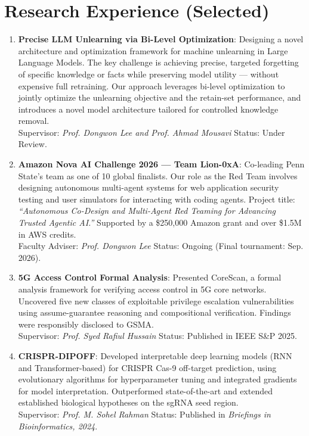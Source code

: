 \section{Research Experience (Selected)}

\begin{enumerate}

    \item \textbf{Precise LLM Unlearning via Bi-Level Optimization}: Designing a novel architecture and optimization framework for machine unlearning in Large Language Models. The key challenge is achieving precise, targeted forgetting of specific knowledge or facts while preserving model utility --- without expensive full retraining. Our approach leverages bi-level optimization to jointly optimize the unlearning objective and the retain-set performance, and introduces a novel model architecture tailored for controlled knowledge removal.\\
    Supervisor: \textit{Prof. Dongwon Lee and Prof. Ahmad Mousavi} \hfill Status: Under Review.

    \item \textbf{Amazon Nova AI Challenge 2026 --- Team Lion-0xA}: Co-leading Penn State's team as one of 10 global finalists. Our role as the Red Team involves designing autonomous multi-agent systems for web application security testing and user simulators for interacting with coding agents. Project title: \textit{``Autonomous Co-Design and Multi-Agent Red Teaming for Advancing Trusted Agentic AI.''} Supported by a \$250{,}000 Amazon grant and over \$1.5M in AWS credits.\\
    Faculty Adviser: \textit{Prof. Dongwon Lee} \hfill Status: Ongoing (Final tournament: Sep. 2026).

    \item \textbf{5G Access Control Formal Analysis}: Presented CoreScan, a formal analysis framework for verifying access control in 5G core networks. Uncovered five new classes of exploitable privilege escalation vulnerabilities using assume-guarantee reasoning and compositional verification. Findings were responsibly disclosed to GSMA.\\
    Supervisor: \textit{Prof. Syed Rafiul Hussain} \hfill Status: Published in IEEE S\&P 2025.

    \item \textbf{CRISPR-DIPOFF}: Developed interpretable deep learning models (RNN and Transformer-based) for CRISPR Cas-9 off-target prediction, using evolutionary algorithms for hyperparameter tuning and integrated gradients for model interpretation. Outperformed state-of-the-art and extended established biological hypotheses on the sgRNA seed region.\\
    Supervisor: \textit{Prof. M. Sohel Rahman} \hfill Status: Published in \textit{Briefings in Bioinformatics, 2024}.


\end{enumerate}
